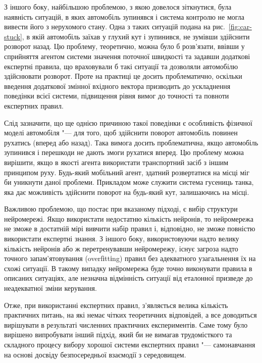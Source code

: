 \documentclass[a4paper,10pt,fleqn]{article}
\begin{document}
З іншого боку, найбільшою проблемою, з якою довелося зіткнутися, була наявність ситуацій, в яких автомобіль зупинявся і система контролю не могла вивести його з нерухомого стану. Одна з таких ситуацій подана на рис.~\ref{fig:car-stuck}, в якій автомобіль заїхав у глухий кут і зупинився, не зумівши здійснити розворот назад. Цю проблему, теоретично, можна було б розв'язати, ввівши у сприйняття агентом системи значення поточної швидкості та задавши додаткові експертні правила, що враховували б такі ситуації та дозволяли автомобілю здійснювати розворот. Проте на практиці це досить проблематично, оскільки введення додаткової змінної вхідного вектора призводить до ускладнення поведінки всієї системи, підвищення рівня вимог до точності та повноти експертних правил. 

Слід зазначити, що ще однією причиною такої поведінки є особливість фізичної моделі автомобіля "--- для того, щоб здійснити поворот автомобіль повинен рухатись (вперед або назад). Така вимога досить проблематична, якщо автомобіль зупинився і перешкоди не дають змоги рухатися вперед. Цю проблему можна вирішити, якщо в якості агента використати транспортний засіб з іншим принципом руху. Будь-який мобільний агент, здатний розвертатися на місці міг би уникнути даної проблеми. Прикладом може служити система гусениць танка, яка дає можливість здійснити поворот на будь-який кут, залишаючись на місці.

Важливою проблемою, що постає при вказаному підході, є вибір структури нейромережі. Якщо використати недостатню кількість нейронів, то нейромережа не зможе в достатній мірі вивчити набір правил і, відповідно, не зможе повністю використати експертні знання. З іншого боку, використовуючи надто велику кількість нейронів або ж перетренувавши нейромережу, існує загроза надто точного запам'ятовування (overfіttіng) правил без адекватного узагальнення їх на схожі ситуації. В такому випадку нейромережа буде точно виконувати правила в описаних ситуаціях, але незначна відмінність ситуації від еталонної призведе до неадекватної зміни керування.

Отже, при використанні експертних правил, з'являється велика кількість практичних питань, на які немає чітких теоретичних відповідей, а все доводиться вирішувати в результаті численних практичних експериментів. Саме тому було вирішено випробувати інший підхід, який би не вимагав трудомісткого та складного процесу вибору хорошої системи експертних правил "--- самонавчання на основі досвіду безпосередньої взаємодії з середовищем.
\end{document}
